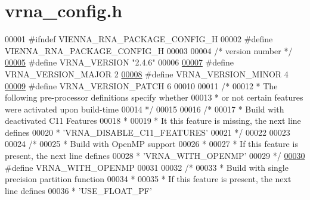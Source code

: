 \hypertarget{vrna__config_8h_source}{}\section{vrna\+\_\+config.\+h}
\label{vrna__config_8h_source}

\begin{DoxyCode}
00001 \textcolor{preprocessor}{#ifndef VIENNA\_RNA\_PACKAGE\_CONFIG\_H}
00002 \textcolor{preprocessor}{#define VIENNA\_RNA\_PACKAGE\_CONFIG\_H}
00003 
00004 \textcolor{comment}{/* version number */}
\mbox{\hyperlink{vrna__config_8h_a8c46eaf0f17d112aabe5cfcbc27d87da}{00005}} \textcolor{preprocessor}{#define VRNA\_VERSION  "2.4.6"}
00006 
\mbox{\hyperlink{vrna__config_8h_ad9da77f0c0a2db0d4b328985a9e971a4}{00007}} \textcolor{preprocessor}{#define VRNA\_VERSION\_MAJOR  2}
\mbox{\hyperlink{vrna__config_8h_ad049cf4c6e50074ccc76c83a3e8c4d37}{00008}} \textcolor{preprocessor}{#define VRNA\_VERSION\_MINOR  4}
\mbox{\hyperlink{vrna__config_8h_a224dee243d144874594f1fa4735702af}{00009}} \textcolor{preprocessor}{#define VRNA\_VERSION\_PATCH  6}
00010 
00011 \textcolor{comment}{/*}
00012 \textcolor{comment}{ * The following pre-processor definitions specify whether}
00013 \textcolor{comment}{ * or not certain features were activated upon build-time}
00014 \textcolor{comment}{ */}
00015 
00016 \textcolor{comment}{/*}
00017 \textcolor{comment}{ * Build with deactivated C11 Features}
00018 \textcolor{comment}{ *}
00019 \textcolor{comment}{ * It this feature is missing, the next line defines}
00020 \textcolor{comment}{ * 'VRNA\_DISABLE\_C11\_FEATURES'}
00021 \textcolor{comment}{ */}
00022 
00023 
00024 \textcolor{comment}{/*}
00025 \textcolor{comment}{ * Build with OpenMP support}
00026 \textcolor{comment}{ *}
00027 \textcolor{comment}{ * If this feature is present, the next line defines}
00028 \textcolor{comment}{ * 'VRNA\_WITH\_OPENMP'}
00029 \textcolor{comment}{ */}
\mbox{\hyperlink{vrna__config_8h_a5e6fe39a69d63bb55eab451c3ab59b9c}{00030}} \textcolor{preprocessor}{#define VRNA\_WITH\_OPENMP}
00031 
00032 \textcolor{comment}{/*}
00033 \textcolor{comment}{ * Build with single precision partition function}
00034 \textcolor{comment}{ *}
00035 \textcolor{comment}{ * If this feature is present, the next line defines}
00036 \textcolor{comment}{ * 'USE\_FLOAT\_PF'}

\end{DoxyCode}
